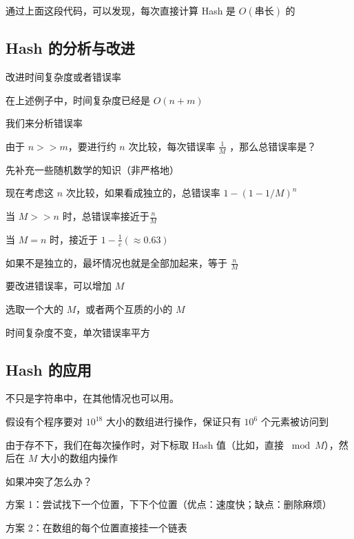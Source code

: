 通过上面这段代码，可以发现，每次直接计算 Hash 是 $O(串长)$ 的

\subsection{Hash 的分析与改进}

改进时间复杂度或者错误率

在上述例子中，时间复杂度已经是 $O(n+m)$

我们来分析错误率

由于 $n >> m$，要进行约 $n$ 次比较，每次错误率 $\frac1{M}$ ，那么总错误率是？

先补充一些随机数学的知识（非严格地）

现在考虑这 $n$ 次比较，如果看成独立的，总错误率 $1-(1-1/M)^n$

当 $M >> n$ 时，总错误率接近于$\frac{n}{M}$

当 $M = n$ 时，接近于 $1-\frac{1}{e} (≈0.63)$

如果不是独立的，最坏情况也就是全部加起来，等于 $\frac{n}{M}$

要改进错误率，可以增加 $M$

选取一个大的 $M$，或者两个互质的小的 $M$

时间复杂度不变，单次错误率平方

\subsection{Hash 的应用}

不只是字符串中，在其他情况也可以用。

假设有个程序要对 $10^{18}$ 大小的数组进行操作，保证只有 $10^6$ 个元素被访问到

由于存不下，我们在每次操作时，对下标取 Hash 值（比如，直接 $\bmod M$），然后在 $M$ 大小的数组内操作

如果冲突了怎么办？

方案 1：尝试找下一个位置，下下个位置（优点：速度快；缺点：删除麻烦）

方案 2：在数组的每个位置直接挂一个链表
